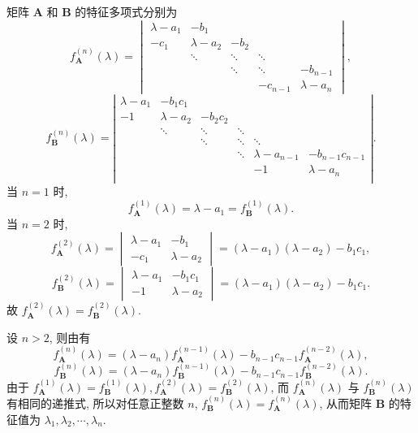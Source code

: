 \documentclass[../../main.tex]{subfiles}
\begin{document}
\begin{solution}
矩阵 \(\boldsymbol{A}\) 和 \(\boldsymbol{B}\) 的特征多项式分别为
\[
f_{\boldsymbol{A}}^{(n)}(\lambda) = \begin{vmatrix} \lambda - a_1 & -b_1 \\ -c_1 & \lambda - a_2 & -b_2 \\ & \ddots & \ddots & \ddots \\ & & \ddots & \ddots & -b_{n - 1} \\ & & & -c_{n - 1} & \lambda - a_n \end{vmatrix},
\]
\[
f_{\boldsymbol{B}}^{(n)}(\lambda) = \left| \begin{matrix}
\lambda -a_1&		-b_1c_1&		&		&		&		\\
-1&		\lambda -a_2&		-b_2c_2&		&		&		\\
&		\ddots&		\ddots&		\ddots&		&		\\
&		&		\ddots&		\ddots&		\ddots&		\\
&		&		&		\ddots&		\lambda -a_{n-1}&		-b_{n-1}c_{n-1}\\
&		&		&		&		-1&		\lambda -a_n\\
\end{matrix} \right|.
\]
当 \(n = 1\) 时,
\[
f_{\boldsymbol{A}}^{(1)}(\lambda) = \lambda - a_1 = f_{\boldsymbol{B}}^{(1)}(\lambda).
\]
当 \(n = 2\) 时,
\[
f_{\boldsymbol{A}}^{(2)}(\lambda) = \begin{vmatrix} \lambda - a_1 & -b_1 \\ -c_1 & \lambda - a_2 \end{vmatrix} = (\lambda - a_1)(\lambda - a_2) - b_1c_1,
\]
\[
f_{\boldsymbol{B}}^{(2)}(\lambda) = \begin{vmatrix} \lambda - a_1 & -b_1c_1 \\ -1 & \lambda - a_2 \end{vmatrix} = (\lambda - a_1)(\lambda - a_2) - b_1c_1.
\]
故 \(f_{\boldsymbol{A}}^{(2)}(\lambda) = f_{\boldsymbol{B}}^{(2)}(\lambda)\).

设 \(n > 2\), 则由有
\[
f_{\boldsymbol{A}}^{(n)}(\lambda) = (\lambda - a_n)f_{\boldsymbol{A}}^{(n - 1)}(\lambda) - b_{n - 1}c_{n - 1}f_{\boldsymbol{A}}^{(n - 2)}(\lambda),
\]
\[
f_{\boldsymbol{B}}^{(n)}(\lambda) = (\lambda - a_n)f_{\boldsymbol{B}}^{(n - 1)}(\lambda) - b_{n - 1}c_{n - 1}f_{\boldsymbol{B}}^{(n - 2)}(\lambda).
\]
由于 \(f_{\boldsymbol{A}}^{(1)}(\lambda) = f_{\boldsymbol{B}}^{(1)}(\lambda), f_{\boldsymbol{A}}^{(2)}(\lambda) = f_{\boldsymbol{B}}^{(2)}(\lambda)\), 而 \(f_{\boldsymbol{A}}^{(n)}(\lambda)\) 与 \(f_{\boldsymbol{B}}^{(n)}(\lambda)\) 有相同的递推式, 所以对任意正整数 \(n\), \(f_{\boldsymbol{B}}^{(n)}(\lambda) = f_{\boldsymbol{A}}^{(n)}(\lambda)\), 从而矩阵 \(\boldsymbol{B}\) 的特征值为 \(\lambda_1, \lambda_2, \cdots, \lambda_n\).

\end{solution}
\end{document}
